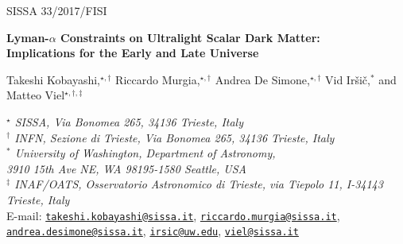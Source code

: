 \documentclass[11pt,nofootinbib]{article}
\numberwithin{equation}{section}
\begin{document}
\newcommand{\comm}[1]{\textcolor{red}{\textbf{#1}}}

\providecommand{\abs}[1]{\lvert#1\rvert}
\providecommand{\bd}[1]{\boldsymbol{#1}}


\begin{titlepage}

\setcounter{page}{1} \baselineskip=15.5pt \thispagestyle{empty}

\begin{flushright}
SISSA 33/2017/FISI
\end{flushright}
\vfil


\bigskip
\begin{center}
 {\LARGE \textbf{Lyman-$\alpha$ Constraints on Ultralight Scalar Dark Matter:}}\\
\medskip 
 {\LARGE \textbf{Implications for the Early and Late Universe}}
\vskip 15pt
\end{center}

\vspace{0.5cm}
\begin{center}
{\Large 
Takeshi Kobayashi,$^{\star, \dagger}$
Riccardo Murgia,$^{\star, \dagger}$
Andrea De Simone,$^{\star, \dagger}$
Vid Ir\v{s}i\v{c},$^{\ast}$
and
Matteo Viel$^{\star, \dagger, \ddagger}$
}\end{center}

\vspace{0.3cm}

\begin{center}
\textit{$^{\star}$ SISSA, Via Bonomea 265, 34136 Trieste, Italy}\\

\vskip 14pt
\textit{$^{\dagger}$ INFN, Sezione di Trieste, Via Bonomea 265,
 34136 Trieste, Italy}\\ 

\vskip 14pt
 \textit{$^{\ast}$ University of Washington, Department of Astronomy,\\
 3910 15th Ave NE, WA 98195-1580 Seattle, USA}\\
 
\vskip 14pt
 \textit{$^{\ddagger}$ INAF/OATS, Osservatorio Astronomico di Trieste, via Tiepolo 11, I-34143 Trieste, Italy}\\   

\vskip 14pt
E-mail:
 \texttt{\href{mailto:takeshi.kobayashi@sissa.it}{takeshi.kobayashi@sissa.it}},
 \texttt{\href{mailto:riccardo.murgia@sissa.it}{riccardo.murgia@sissa.it}},
 \texttt{\href{mailto:andrea.desimone@sissa.it}{andrea.desimone@sissa.it}},
 \texttt{\href{mailto:irsic@uw.edu}{irsic@uw.edu}},
 \texttt{\href{mailto:viel@sissa.it}{viel@sissa.it}}


\end{center}
\end{titlepage}
\end{document}
